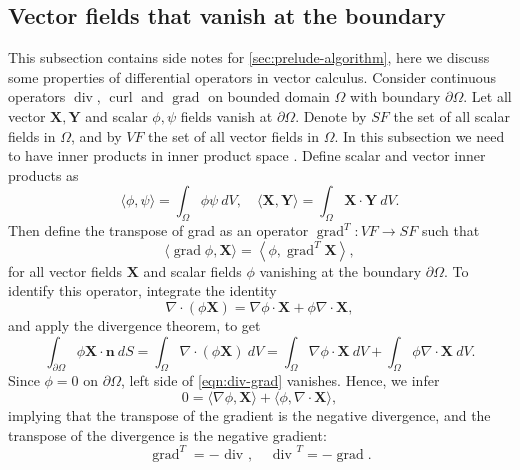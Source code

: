 \documentclass{article}
\numberwithin{equation}{section}
\begin{document}
\subsection{Vector fields that vanish at the boundary}
This subsection contains side notes for \cref{sec:prelude-algorithm}, here we discuss some properties of differential operators in vector calculus. Consider continuous operators $\operatorname{div}$, $\operatorname{curl}$ and $\operatorname{grad}$ on bounded domain $\Omega$ with boundary $\partial \Omega$. Let all vector $\boldsymbol{X},\boldsymbol{Y}$ and scalar $\phi,\psi$ fields vanish at $\partial \Omega$. Denote by $SF$ the set of all scalar fields in $\Omega$, and by $VF$ the set of all vector fields in $\Omega$. In this subsection we need to have inner products in inner product space \cite{Gamtumur:2019}. Define scalar and vector inner products as
\begin{equation}
	\langle\phi, \psi\rangle=\int_{\Omega} \phi \psi\ dV,\quad
	\langle \boldsymbol{X}, \boldsymbol{Y}\rangle=\int_{\Omega} \boldsymbol{X} \cdot \boldsymbol{Y}\ dV.
\end{equation}
Then define the transpose of grad as an operator $\operatorname{grad}^T: V F \rightarrow S F$ such that
\begin{equation}
	\langle  \operatorname{grad} \phi,\boldsymbol{X}\rangle=\left\langle\phi, \operatorname{grad}^T \boldsymbol{X}\right\rangle,
\end{equation}
for all vector fields $\boldsymbol{X}$ and scalar fields $\phi$ vanishing at the boundary $\partial \Omega$. To identify this operator, integrate the identity
\begin{equation}
	\nabla \cdot(\phi \boldsymbol{X})= \nabla \phi\cdot \boldsymbol{X}+ \phi \nabla \cdot \boldsymbol{X},
\end{equation}
and apply the divergence theorem, to get
\begin{equation}\label{eqn:div-grad}
	\int_{\partial \Omega} \phi \boldsymbol{X} \cdot \boldsymbol{n}\ dS=\int_{\Omega} \nabla \cdot(\phi \boldsymbol{X})\ dV=\int_{\Omega} \nabla \phi\cdot \boldsymbol{X}\ dV +\int_{\Omega} \phi \nabla \cdot \boldsymbol{X}\ dV.
\end{equation}
Since $\phi=0$ on $\partial \Omega$, left side of \cref{eqn:div-grad} vanishes. Hence, we infer
\begin{equation}\label{eqn:inner-grad-div}
	0=\langle \nabla \phi,\boldsymbol{X}\rangle+\langle\phi, \nabla \cdot \boldsymbol{X}\rangle,
\end{equation}
implying that the transpose of the gradient is the negative divergence, and the transpose of the divergence is the negative gradient:
\begin{equation}\label{eqn:curl-grad}
	\operatorname{grad}^T=- \text { div }, \quad \text { div }^T=-\operatorname{grad} .
\end{equation}
\end{document}
